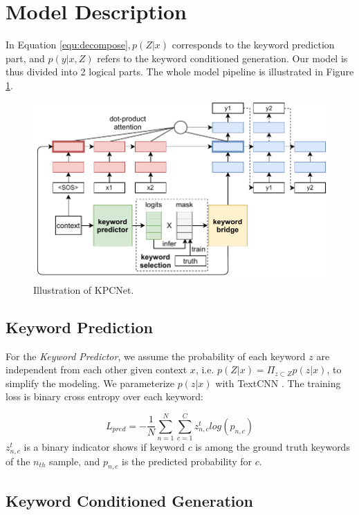 \section{Model Description}
\label{sec:KPCNet}
In Equation \ref{equ:decompose}$, p(Z|x)$ corresponds to the keyword prediction part, and $p(y|x,Z)$ refers to the keyword conditioned generation. Our model is thus divided into 2 logical parts. The whole model pipeline is illustrated in Figure \ref{fig:pipeline}. 


\begin{figure}[htbp]
  \centering
  \includegraphics[width=1\linewidth]{kwd_model.pdf}
  \caption{Illustration of KPCNet.}
  \label{fig:pipeline}
  \end{figure}

\subsection{Keyword Prediction}

For the \textit{Keyword Predictor}, we assume the probability of each keyword $z$ are independent from each other given context $x$, i.e. $p(Z|x)=\Pi_{z \subset Z}p(z|x)$, to simplify the modeling. We parameterize $p(z|x)$ with TextCNN \citep{kim-2014-convolutional}. The training loss is binary cross entropy over each keyword:

\begin{equation}
  L_{pred} = -\frac{1}{N}\sum_{n=1}^{N}\sum_{c=1}^{C}z^t_{n,c}log(p_{n,c})
  \label{equ:pred}
\end{equation}
$z^t_{n,c}$ is a binary indicator shows if keyword $c$ is among the ground truth keywords of the $n_{th}$ sample, and $p_{n,c}$ is the predicted probability for $c$.

\subsection{Keyword Conditioned Generation}

